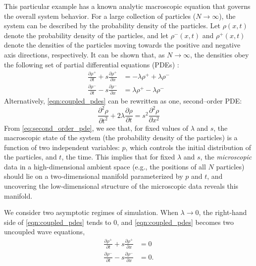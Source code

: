 \documentclass[prl, reprint]{revtex4-1}
\begin{document}
This particular example has a known analytic macroscopic equation that governs the overall system behavior.
%
For a large collection of particles ($N \rightarrow \infty$), the system can be described by the probability density of the particles.
%
Let $\rho(x, t)$ denote the probability density of the particles, and let $\rho^-(x, t)$ and $\rho^+(x, t)$ denote the densities of the particles moving towards the positive and negative axis directions, respectively.
%
It can be shown that, as $N \rightarrow \infty$, the densities obey the following set of partial differential equations (PDEs) \cite{othmer2000diffusion}:
\begin{equation} \label{eqn:coupled_pdes}
\begin{aligned}
\frac{\partial \rho^+}{\partial t} + s \frac{\partial \rho^+}{\partial x} & = -\lambda \rho^+ +\lambda \rho^- \\
\frac{\partial \rho^-}{\partial t} - s \frac{\partial \rho^-}{\partial x} & = \lambda \rho^+ -\lambda \rho^- 
\end{aligned}
\end{equation}
%
Alternatively, \eqref{eqn:coupled_pdes} can be rewritten as one, second--order PDE:
\begin{equation} \label{eq:second_order_pde}
\frac{\partial^2 \rho}{\partial t^2} + 2 \lambda \frac{\partial \rho}{\partial t} = s^2 \frac{\partial ^2 \rho}{\partial x^2}
\end{equation}
%
%
From \eqref{eq:second_order_pde}, we see that, for fixed values of $\lambda$ and $s$, the macroscopic state of the system (the probability density of the particles) is a function of two independent variables: $p$, which controls the initial distribution of the particles, and $t$, the time. 
%
This implies that for fixed $\lambda$ and $s$, the {\em microscopic} data in a high-dimensional ambient space (e.g., the positions of all $N$ particles) should lie on a two-dimensional manifold parameterized by $p$ and $t$, 
and uncovering the low-dimensional structure of the microscopic data reveals this manifold.

We consider two asymptotic regimes of simulation.
%
When $\lambda \rightarrow 0$, the right-hand side of \eqref{eqn:coupled_pdes} tends to 0, and \eqref{eqn:coupled_pdes} becomes two uncoupled wave equations,
\begin{equation}
\begin{aligned}
\frac{\partial \rho^+}{\partial t} + s \frac{\partial \rho^+}{\partial x} & = 0 \\
\frac{\partial \rho^-}{\partial t} - s \frac{\partial \rho^-}{\partial x} & = 0.
\end{aligned}
\end{equation}
\end{document}
